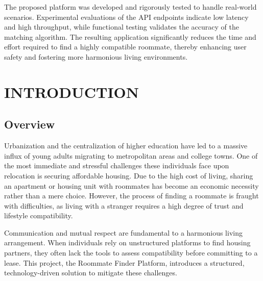\documentclass[12pt,a4paper]{report}
\begin{document}
The proposed platform was developed and rigorously tested to handle real-world scenarios. Experimental evaluations of the API endpoints indicate low latency and high throughput, while functional testing validates the accuracy of the matching algorithm. The resulting application significantly reduces the time and effort required to find a highly compatible roommate, thereby enhancing user safety and fostering more harmonious living environments.

\newpage
{}

\chapter{INTRODUCTION}

\section{Overview}
Urbanization and the centralization of higher education have led to a massive influx of young adults migrating to metropolitan areas and college towns. One of the most immediate and stressful challenges these individuals face upon relocation is securing affordable housing. Due to the high cost of living, sharing an apartment or housing unit with roommates has become an economic necessity rather than a mere choice. However, the process of finding a roommate is fraught with difficulties, as living with a stranger requires a high degree of trust and lifestyle compatibility. 

Communication and mutual respect are fundamental to a harmonious living arrangement. When individuals rely on unstructured platforms to find housing partners, they often lack the tools to assess compatibility before committing to a lease. This project, the Roommate Finder Platform, introduces a structured, technology-driven solution to mitigate these challenges.
\end{document}
